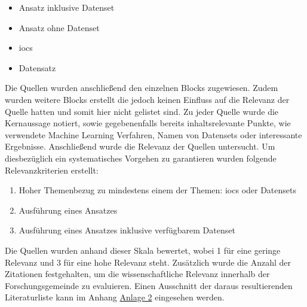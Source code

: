 \documentclass[
    12pt, %
    DIV10,
    ngerman, %
    a4paper, %
    oneside, %
    titlepage, %
    parskip=half, %
    headings=normal, %
    listof=totoc, %
    bibliography=totoc, %
    index=totoc, %
    captions=tableheading, %
    final %
]{scrreprt}
\begin{document}
\begin{itemize}
\item Ansatz inklusive Datenset
\item Ansatz ohne Datenset
\item \ac{iocs}
\item Datensatz
\end{itemize}
Die Quellen wurden anschließend den einzelnen Blocks zugewiesen. Zudem wurden weitere Blocks erstellt die jedoch keinen Einfluss auf die Relevanz der Quelle hatten und somit hier nicht gelistet sind. Zu jeder Quelle wurde die Kernaussage notiert, sowie gegebenenfalls bereits inhaltsrelevante Punkte, wie verwendete Machine Learning Verfahren, Namen von Datensets oder interessante Ergebnisse. Anschließend wurde die Relevanz der Quellen untersucht. 
Um diesbezüglich ein systematisches Vorgehen zu garantieren wurden folgende Relevanzkriterien erstellt:
\begin{enumerate}
\item Hoher Themenbezug zu mindestens einem der Themen: \ac{iocs} oder Datensets
\item Ausführung eines Ansatzes
\item Ausführung eines Ansatzes inklusive verfügbarem Datenset
\end{enumerate}
Die Quellen wurden anhand dieser Skala bewertet, wobei 1 für eine geringe Relevanz und 3 für eine hohe Relevanz steht.
Zusätzlich wurde die Anzahl der Zitationen festgehalten, um die wissenschaftliche Relevanz innerhalb der Forschungsgemeinde zu evaluieren. Einen Ausschnitt der daraus resultierenden Literaturliste kann im Anhang \hyperref[literaturr]{Anlage 2} eingesehen werden.
\end{document}
